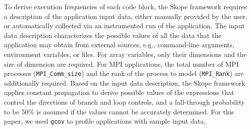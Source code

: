 To derive execution frequencies of each code block, the Skope framework requires a description of the application input data,
either manually provided by the user,  or automatically collected via an instrumented run of the application.
The input data description characterizes the possible values of all the data that the application may obtain from external sources,
e.g., command-line arguments, environment variables, or files.
For array variables, only their dimensions and the size of dimension are required.
For MPI applications, the total number of MPI processes (\texttt{MPI\_Comm\_size}) and the rank of the process to model (\texttt{MPI\_Rank}) are additionally required.
Based on the input data description, the Skope framework applies constant propagation to derive possible values of the expressions that
control the directions of branch and loop controls, and a fall-through probability to be 50\% is assumed if the values cannot be accurately determined.
For this paper, we used \texttt{gcov} to profile applications with sample input data,


